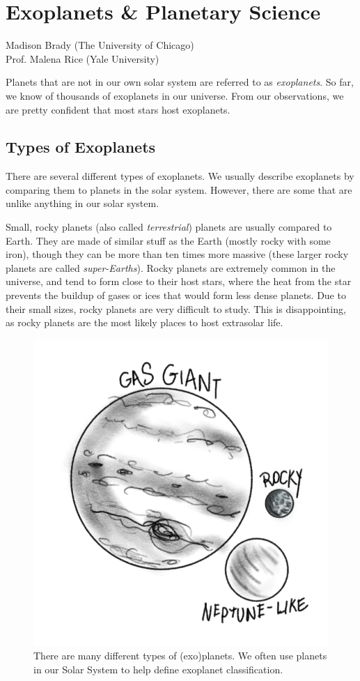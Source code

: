 \section{Exoplanets \& Planetary Science}

\begin{sectionauthor}
    Madison Brady (The University of Chicago) \\
    Prof. Malena Rice (Yale University)
\end{sectionauthor}
\vspace{20pt}


\noindent Planets that are not in our own solar system are referred to as \textit{exoplanets}.  So far, we know of thousands of exoplanets in our universe.  From our observations, we are pretty confident that most stars host exoplanets.

\subsection{Types of Exoplanets}

There are several different types of exoplanets.  We usually describe exoplanets by comparing them to planets in the solar system.  However, there are some that are unlike anything in our solar system.


Small, rocky planets (also called \textit{terrestrial}) planets are usually compared to Earth.  They are made of similar stuff as the Earth (mostly rocky with some iron), though they can be more than ten times more massive (these larger rocky planets are called \textit{super-Earths}).  Rocky planets are extremely common in the universe, and tend to form close to their host stars, where the heat from the star prevents the buildup of gases or ices that would form less dense planets.  Due to their small sizes, rocky planets are very difficult to study.  This is disappointing, as rocky planets are the most likely places to host extrasolar life.

\begin{figure}[h!]
    \centering
    \includegraphics[width=0.4\linewidth]{img/planets.png}
    \caption{There are many different types of (exo)planets. We often use planets in our Solar System to help define exoplanet classification.}
    \label{fig:planets}
\end{figure}

